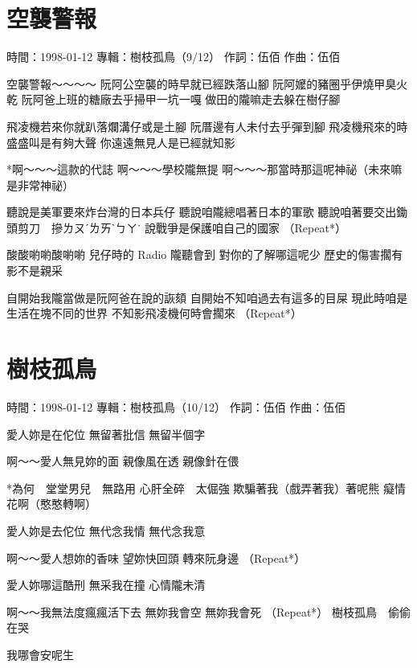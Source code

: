 \documentclass[UTF8,a4paper,oneside,twocolumn,12pt]{ctexbook}
\newcommand{\infopair}[2]{\textbullet #1：#2}
\newcommand{\zc}[1][伍佰]{\infopair{作詞}{#1}}
\newcommand{\zq}[1][伍佰]{\infopair{作曲}{#1}}
\newcommand{\zj}[1]{\infopair{專輯}{#1}}
\newcommand{\sj}[1]{\infopair{時間}{#1}}
\newenvironment{info}{\begin{flushleft}\kaishu
	}
	{\end{flushleft}\normalsize\yahei\par}
\newenvironment{lyric}{
	}
{}
\begin{document}
\section{空襲警報}
\begin{info}
	\sj{1998-01-12}
	\zj{樹枝孤鳥（9/12）}
	\zc
	\zq
\end{info}
\begin{lyric}
	空襲警報～～～～
	阮阿公空襲的時早就已經跌落山腳
	阮阿嬤的豬圈乎伊燒甲臭火乾
	阮阿爸上班的糖廠去乎掃甲一坑一嘎
	做田的隴嘛走去躲在樹仔腳

	飛凌機若來你就趴落爛溝仔或是土腳
	阮厝邊有人未付去乎彈到腳
	飛凌機飛來的時盛盛叫是有夠大聲
	你遠遠無見人是已經就知影

	*啊～～～這款的代誌
	啊～～～學校隴無提
	啊～～～那當時那這呢神祕（未來嘛是非常神祕）

	聽說是美軍要來炸台灣的日本兵仔
	聽說咱隴總唱著日本的軍歌
	聽說咱著要交出鋤頭剪刀　摻ㄌㄡˊㄌㄞˋㄅㄚ˙
	說戰爭是保護咱自己的國家
	（Repeat*）

	酸酸喲喲酸喲喲
	兒仔時的 Radio 隴聽會到
	對你的了解哪這呢少
	歷史的傷害擱有影不是親采

	自開始我隴當做是阮阿爸在說的詼頦
	自開始不知咱過去有這多的目屎
	現此時咱是生活在塊不同的世界
	不知影飛凌機何時會擱來
	（Repeat*）
\end{lyric}

\section{樹枝孤鳥}
\begin{info}
	\sj{1998-01-12}
	\zj{樹枝孤鳥（10/12）}
	\zc
	\zq
\end{info}
\begin{lyric}
	愛人妳是在佗位
	無留著批信
	無留半個字

	啊～～愛人無見妳的面
	親像風在透
	親像針在偎

	*為何　堂堂男兒　無路用
	心肝全碎　太倔強
	欺騙著我（戲弄著我）著呢熊
	癡情花啊（憨憨轉啊）

	愛人妳是去佗位
	無代念我情
	無代念我意

	啊～～愛人想妳的香味
	望妳快回頭
	轉來阮身邊
	（Repeat*）

	愛人妳哪這酷刑
	無采我在撞
	心情隴未清

	啊～～我無法度瘋瘋活下去
	無妳我會空
	無妳我會死
	（Repeat*）
	樹枝孤鳥　偷偷在哭

	我哪會安呢生
\end{lyric}
\end{document}
